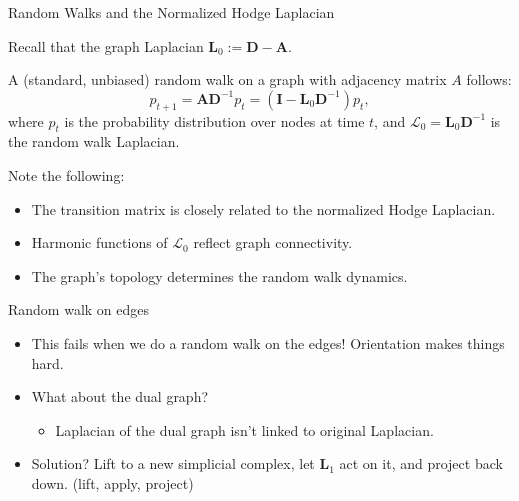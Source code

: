 \documentclass[aspectratio=169,xcolor=dvipsnames]{beamer}
\def\L{\boldsymbol{L}}
\def\D{\boldsymbol{D}}
\begin{document}
\begin{frame}{Random Walks and the Normalized Hodge Laplacian}

Recall that the graph Laplacian $\L_0:=\D-\boldsymbol{A}$. 

A (standard, unbiased) random walk on a graph with adjacency matrix \( A \) follows:
\[
p_{t+1} = \boldsymbol{A}\D^{-1}p_t = (\boldsymbol{I} - \L_0 \D^{-1})p_t,
\]
where \( p_t \) is the probability distribution over nodes at time \( t \), and \( \mathcal{L}_0 = \L_0 \D^{-1} \) is the random walk Laplacian.

\vspace{0.5em}
Note the following: 
\begin{itemize}
    \item The transition matrix is closely related to the normalized Hodge Laplacian.
    \item Harmonic functions of \( \mathcal{L}_0 \) reflect graph connectivity.
    \item The graph's topology determines the random walk dynamics.
\end{itemize}

\end{frame}


\begin{frame}{Random walk on edges}
    \begin{itemize}
    \item This fails when we do a random walk on the edges! Orientation makes things hard. 
    \item What about the dual graph?
        \begin{itemize}
            \item Laplacian of the dual graph isn't linked to original Laplacian. 
        \end{itemize}
    \item Solution? Lift to a new simplicial complex, let $\L_1$ act on it, and project back down. (lift, apply, project)
    \end{itemize}
\end{frame}
\end{document}
